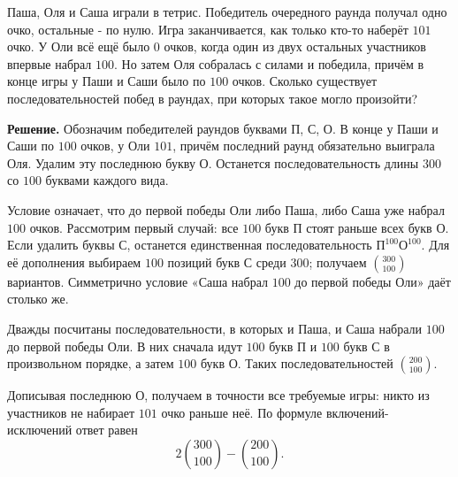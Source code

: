\begin{problems}
\item Паша, Оля и Саша играли в тетрис. Победитель очередного раунда получал одно очко, остальные - по нулю. Игра заканчивается, как только кто-то наберёт $101$ очко. У Оли всё ещё было $0$ очков, когда один из двух остальных участников впервые набрал $100$. Но затем Оля собралась с силами и победила, причём в конце игры у Паши и Саши было по $100$ очков. Сколько существует последовательностей побед в раундах, при которых такое могло произойти?
\par\smallskip\noindent\textbf{Решение.} Обозначим победителей раундов буквами П, С, О. В конце у Паши и Саши по $100$ очков, у Оли $101$, причём последний раунд обязательно выиграла Оля. Удалим эту последнюю букву О. Останется последовательность длины $300$ со $100$ буквами каждого вида.
\par Условие означает, что до первой победы Оли либо Паша, либо Саша уже набрал $100$ очков. Рассмотрим первый случай: все $100$ букв П стоят раньше всех букв О. Если удалить буквы С, останется единственная последовательность $\text{П}^{100}\text{О}^{100}$. Для её дополнения выбираем $100$ позиций букв С среди $300$; получаем $\binom{300}{100}$ вариантов. Симметрично условие «Саша набрал $100$ до первой победы Оли» даёт столько же.
\par Дважды посчитаны последовательности, в которых и Паша, и Саша набрали $100$ до первой победы Оли. В них сначала идут $100$ букв П и $100$ букв С в произвольном порядке, а затем $100$ букв О. Таких последовательностей $\binom{200}{100}$.
\par Дописывая последнюю О, получаем в точности все требуемые игры: никто из участников не набирает $101$ очко раньше неё. По формуле включений-исключений ответ равен
\[
2\binom{300}{100}-\binom{200}{100}.
\]\par


\end{problems}

